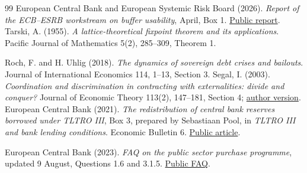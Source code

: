 \begin{thebibliography}{99}
European Central Bank and European Systemic Risk Board (2026). \emph{Report of the ECB--ESRB workstream on buffer usability}, April, Box 1. \href{https://www.ecb.europa.eu/pub/pdf/other/ecb.reportECBESRBworkstreambufferusability202604.en.pdf}{Public report}.
Tarski, A. (1955). \emph{A lattice-theoretical fixpoint theorem and its applications}. Pacific Journal of Mathematics 5(2), 285--309, Theorem 1.

Roch, F. and H. Uhlig (2018). \emph{The dynamics of sovereign debt crises and bailouts}. Journal of International Economics 114, 1--13, Section 3.
Segal, I. (2003). \emph{Coordination and discrimination in contracting with externalities: divide and conquer?} Journal of Economic Theory 113(2), 147--181, Section 4; \href{https://web.stanford.edu/~isegal/discrim.pdf}{author version}.
European Central Bank (2021). \emph{The redistribution of central bank reserves borrowed under TLTRO III}, Box 3, prepared by Sebastiaan Pool, in \emph{TLTRO III and bank lending conditions}. Economic Bulletin 6. \href{https://www.ecb.europa.eu/press/economic-bulletin/articles/2021/html/ecb.ebart202106_02~35bf40777b.en.html}{Public article}.

European Central Bank (2023). \emph{FAQ on the public sector purchase programme}, updated 9 August, Questions 1.6 and 3.1.5. \href{https://www.ecb.europa.eu/mopo/implement/app/html/ecb.faq_pspp.en.html}{Public FAQ}.

\end{thebibliography}
\endgroup
